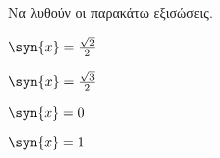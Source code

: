 Να λυθούν οι παρακάτω εξισώσεις.
\begin{multicols}{2}
\begin{alist}
\item $ \syn{x}=\frac{\sqrt{2}}{2} $
\item $ \syn{x}=\frac{\sqrt{3}}{2} $
\item $ \syn{x}=0 $
\item $ \syn{x}=1 $
\end{alist}
\end{multicols}
